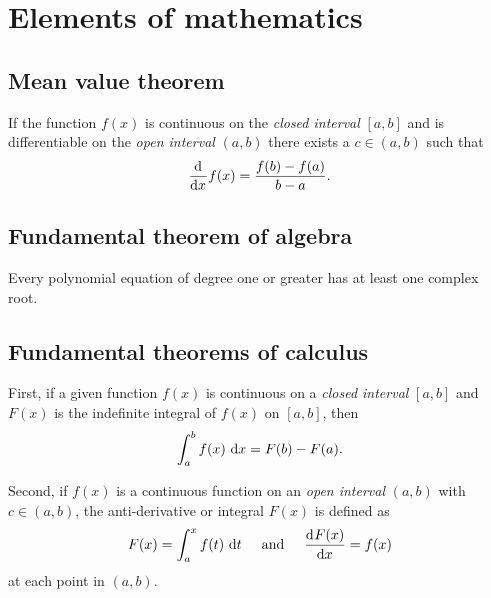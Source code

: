 
\chapter{Elements of mathematics} \label{continuum}

\section{Mean value theorem}

If the function $f(x)$ is continuous on the \emph{closed interval} $[a,b]$ and is differentiable on the \emph{open interval} $(a,b)$ there exists a $c \in (a,b)$ such that 
\begin{align}
  \label{mean_value_theorem}
  \frac{\mathrm{d}^{} }{\mathrm{d} x^{} } f(x) = \frac{f(b) - f(a)}{b - a}.
\end{align}

\section{Fundamental theorem of algebra}

Every polynomial equation of degree one or greater has at least one complex root. 

\section{Fundamental theorems of calculus}

First, if a given function $f(x)$ is continuous on a \emph{closed interval} $[a,b]$ and $F(x)$ is the indefinite integral of $f(x)$ on $[a,b]$, then
\begin{align}
  \label{first_fundamental_theorem_of_calculus}
  \int_a^b f(x) \ \mathrm{d}x = F(b) - F(a).
\end{align}

Second, if $f(x)$ is a continuous function on an \emph{open interval} $(a,b)$ with $c \in (a,b)$, the anti-derivative or integral $F(x)$ is defined as
\begin{align}
  F(x) = \int_a^x f(t) \ \mathrm{d}t \hspace{5mm} \text{and} \hspace{5mm} 
  \frac{\mathrm{d}^{} F(x)}{\mathrm{d} x^{} } = f(x)
\end{align}
at each point in $(a,b)$.

